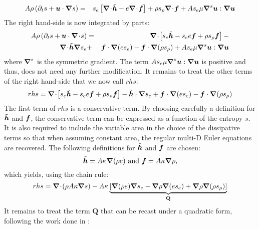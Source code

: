 %
\begin{eqnarray}
\label{eq:ent_res_app2}
A \rho \left( \partial_t s + \boldsymbol u \cdot \boldsymbol{\nabla} s \right) &=& s_e \left[ \boldsymbol{\nabla}\! \cdot \! \tilde{\boldsymbol h}-e \boldsymbol{\nabla}\! \cdot \! \boldsymbol f \right] + \rho s_{\rho} \boldsymbol{\nabla}\! \cdot \! \boldsymbol f  + A s_e \mu \boldsymbol{\nabla}^s \boldsymbol u : \boldsymbol{\nabla} \boldsymbol u\nonumber
\end{eqnarray}
%
The right hand-side is now integrated by parts:
%
\begin{eqnarray}
\label{eq:ent_res_app3}
A \rho \left( \partial_t s + \boldsymbol u \cdot \boldsymbol{\nabla}\! \cdot \! s \right) &=& \boldsymbol{\nabla}\! \cdot \! \left[ s_e \tilde{\boldsymbol h}-s_e e \boldsymbol f  + \rho s_{\rho} \boldsymbol f \right] -\nonumber \\
\boldsymbol{\nabla}\! \cdot \! \tilde{\boldsymbol h} \boldsymbol{\nabla} s_e  &+& \boldsymbol f \cdot \boldsymbol{\nabla} (e s_e) - \boldsymbol f \cdot \boldsymbol{\nabla} ( \rho s_{\rho} ) + A s_e \mu \boldsymbol{\nabla}^s \boldsymbol u : \boldsymbol{\nabla} \boldsymbol u \nonumber
\end{eqnarray}
%
where $\boldsymbol{\nabla}^s$ is the symmetric gradient. The term $A s_e \mu \boldsymbol{\nabla}^s \boldsymbol u : \boldsymbol{\nabla} \boldsymbol u$ is positive and thus, does not need any further modification. It %
remains to treat the other terms of the right hand-side that we now call $rhs$:
%
\begin{equation}\label{eq:rhs-euler-equ-app1}
rhs = \boldsymbol{\nabla}\! \cdot \! \left[ s_e \tilde{\boldsymbol h}-s_e e \boldsymbol f  + \rho s_{\rho} \boldsymbol f \right] - \tilde{\boldsymbol h} \cdot \boldsymbol{\nabla} s_e  + \boldsymbol f \cdot \boldsymbol{\nabla} (e s_e) - \boldsymbol f \cdot \boldsymbol{\nabla} ( \rho s_{\rho} ) \nonumber
\end{equation}
%
The first term of $rhs$ is a conservative term. By choosing carefully a definition for $\tilde{\boldsymbol h}$ and $\boldsymbol f$, the conservative term can be expressed as a function of the entropy $s$. It is also required to include the variable area in the choice of the dissipative terms so that when assuming constant area, the regular multi-D Euler equations are recovered. The following definitions for $\tilde{\boldsymbol h}$ and $\boldsymbol f$ are chosen:
%
\begin{equation}
\tilde{\boldsymbol h} = A \kappa \boldsymbol{\nabla} ( \rho e ) \text{ and } \boldsymbol f = A \kappa \boldsymbol{\nabla} \rho, \nonumber 
\end{equation}
%
which yields, using the chain rule:
%
\begin{equation}
rhs = \boldsymbol{\nabla}\! \cdot \! (\rho A \kappa \boldsymbol{\nabla} s ) - A \kappa \underbrace{\left[ \boldsymbol{\nabla} (\rho e) \boldsymbol{\nabla} s_e  - \boldsymbol{\nabla} \rho \boldsymbol{\nabla} (e s_e) +  \boldsymbol{\nabla} \rho \boldsymbol{\nabla} ( \rho s_{\rho} )  \right]}_{\mathbf{Q}} \nonumber
\end{equation}
%
It remains to treat the term $\mathbf{Q}$ that can be recast under a quadratic form, following the work done in \cite{jlg}:
